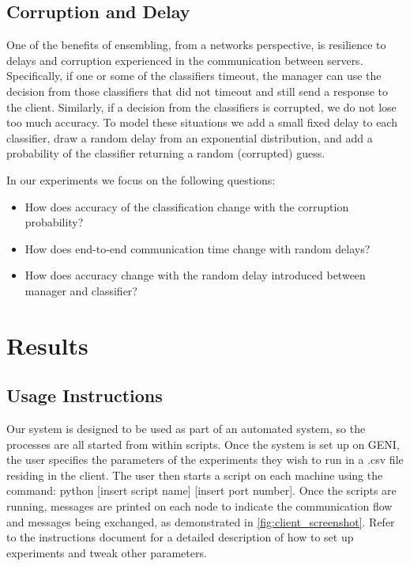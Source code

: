 \documentclass[11pt]{article}
\begin{document}
\subsection{Corruption and Delay}

One of the benefits of ensembling, from a networks perspective, is resilience to delays and corruption experienced in the communication between servers. Specifically, if one or some of the classifiers timeout, the manager can use the decision from those classifiers that did not timeout and still send a response to the client. Similarly, if a decision from the classifiers is corrupted, we do not lose too much accuracy. 
To model these situations we add a small fixed delay to each classifier, draw a random delay from an exponential distribution, and add a probability of the classifier returning a random (corrupted) guess.

In our experiments we focus on the following questions:
\begin{itemize}
	\item How does accuracy of the classification change with the corruption probability?
	\item How does end-to-end communication time change with random delays?
	\item  How does accuracy change with the random delay introduced  between manager and classifier?
\end{itemize}

\section{Results}

\subsection{Usage Instructions}

Our system is designed to be used as part of an automated system, so the processes are all started from within scripts.
Once the system is set up on GENI, the user specifies the parameters of the experiments they wish to run in a .csv file residing in the client.
The user then starts a script on each machine using the command: python [insert script name] [insert port number].
Once the scripts are running, messages are printed on each node to indicate the communication flow and messages being exchanged, as demonstrated in \ref{fig:client_screenshot}.
Refer to the instructions document for a detailed description of how to set up experiments and tweak other parameters. 
\end{document}
